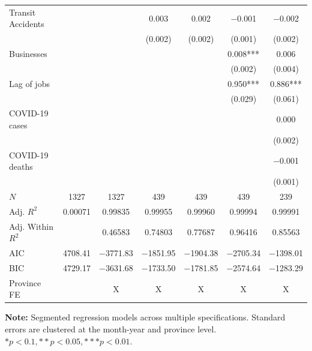 \documentclass[11pt,a4paper]{article}\usepackage[]{graphicx}\usepackage[]{xcolor}
\begin{document}
\begin{table}[htbp!]
\begin{tabular}[t]{lcccccc}
Transit Accidents &  &  & \num{0.003} & \num{0.002} & \num{-0.001} & \num{-0.002}\\
 &  &  & (\num{0.002}) & (\num{0.002}) & (\num{0.001}) & (\num{0.002})\\
Businesses &  &  &  &  & \num{0.008}*** & \num{0.006}\\
 &  &  &  &  & (\num{0.002}) & (\num{0.004})\\
Lag of jobs &  &  &  &  & \num{0.950}*** & \num{0.886}***\\
 &  &  &  &  & (\num{0.029}) & (\num{0.061})\\
COVID-19 cases &  &  &  &  &  & \num{0.000}\\
 &  &  &  &  &  & (\num{0.002})\\
COVID-19 deaths &  &  &  &  &  & \num{-0.001}\\
 &  &  &  &  &  & (\num{0.001})\\
\midrule
$N$ & \num{1327} & \num{1327} & \num{439} & \num{439} & \num{439} & \num{239}\\
Adj. $R^2$ & \num{0.00071} & \num{0.99835} & \num{0.99955} & \num{0.99960} & \num{0.99994} & \num{0.99991}\\
Adj. Within $R^2$ &  & \num{0.46583} & \num{0.74803} & \num{0.77687} & \num{0.96416} & \num{0.85563}\\
AIC & \num{4708.41} & \num{-3771.83} & \num{-1851.95} & \num{-1904.38} & \num{-2705.34} & \num{-1398.01}\\
BIC & \num{4729.17} & \num{-3631.68} & \num{-1733.50} & \num{-1781.85} & \num{-2574.64} & \num{-1283.29}\\
Province FE &  & X & X & X & X & X\\
\bottomrule
\end{tabular}


\vspace{0.3cm}
\textbf{Note:} Segmented regression models across multiple specifications. Standard errors are clustered at the month-year and province level.\\
$ *p < 0.1, **p < 0.05, ***p < 0.01.$
\end{table}
\end{document}
